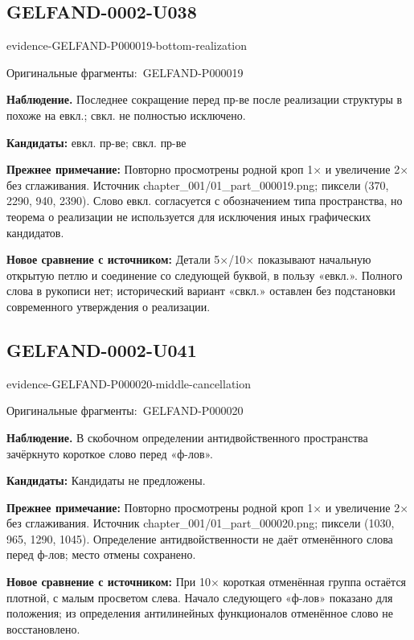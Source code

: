 \documentclass[11pt]{article}
\newcommand{\EvidenceBlock}[4]{%
 \par\smallskip\noindent\begin{minipage}{\linewidth}
 \begin{minipage}[t]{.47\linewidth}\vspace{0pt}\centering
 \csname evidence-#1-#2\endcsname\par
 {\scriptsize\SourceCropCaption\ #1}\par
 \end{minipage}\hfill
 \begin{minipage}[t]{.49\linewidth}\vspace{0pt}\raggedright
 {\small\color{orange!65!black}\textbf{#4} #3}\par
 \end{minipage}
 \end{minipage}\par\smallskip}
\newcommand{\SourceCropCaption}{Оригинальные фрагменты:}\newcommand{\ReadingCaption}{Сомнительное чтение.}\newcommand{\IncompleteCaption}{Неразобранный фрагмент.}\newcommand{\DiagramCaption}{Рисунок и набранное описание.}
\begin{document}
\subsection*{GELFAND-0002-U038}
\EvidenceBlock{GELFAND-P000019}{bottom-realization}{Последнее сокращение перед пр-ве после реализации структуры в похоже на евкл.; свкл. не полностью исключено.}{Наблюдение.}
\par\smallskip\noindent\textbf{Кандидаты: } евкл. пр-ве; свкл. пр-ве\par
\par\smallskip\noindent\textbf{Прежнее примечание: } Повторно просмотрены родной кроп 1× и увеличение 2× без сглаживания. Источник chapter\_001/01\_part\_000019.png; пиксели (370, 2290, 940, 2390). Слово евкл. согласуется с обозначением типа пространства, но теорема о реализации не используется для исключения иных графических кандидатов.\par
\par\smallskip\noindent\textbf{Новое сравнение с источником: } Детали 5×/10× показывают начальную открытую петлю и соединение со следующей буквой, в пользу «евкл.». Полного слова в рукописи нет; исторический вариант «свкл.» оставлен без подстановки современного утверждения о реализации.\par

\subsection*{GELFAND-0002-U041}
\EvidenceBlock{GELFAND-P000020}{middle-cancellation}{В скобочном определении антидвойственного пространства зачёркнуто короткое слово перед «ф-лов».}{Наблюдение.}
\par\smallskip\noindent\textbf{Кандидаты: } Кандидаты не предложены.\par
\par\smallskip\noindent\textbf{Прежнее примечание: } Повторно просмотрены родной кроп 1× и увеличение 2× без сглаживания. Источник chapter\_001/01\_part\_000020.png; пиксели (1030, 965, 1290, 1045). Определение антидвойственности не даёт отменённого слова перед ф-лов; место отмены сохранено.\par
\par\smallskip\noindent\textbf{Новое сравнение с источником: } При 10× короткая отменённая группа остаётся плотной, с малым просветом слева. Начало следующего «ф-лов» показано для положения; из определения антилинейных функционалов отменённое слово не восстановлено.\par
\end{document}
